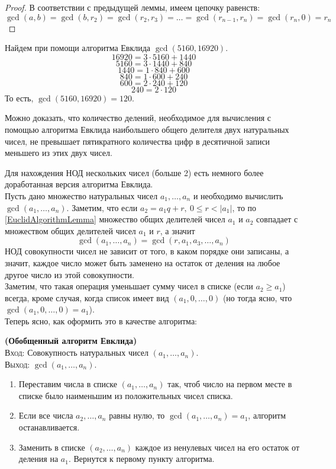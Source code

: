 \documentclass[11pt]{article}
\begin{document}
	\begin{proof}
	    В соответствии с предыдущей леммы, имеем цепочку равенств:
		\[ \gcd(a, b) = \gcd(b, r_2) = \gcd(r_2, r_3) = \ldots = \gcd(r_{n - 1}, r_n) = \gcd(r_n, 0) = r_n \]
	\end{proof}
	\begin{example} Найдем при помощи алгоритма Евклида $\gcd(5160, 16920)$.
	\[ 16920 = 3 \cdot 5160 + 1440 \]
	\[ 5160 = 3 \cdot 1440 + 840 \]
	\[ 1440 = 1 \cdot 840 + 600 \]
	\[ 840 = 1 \cdot 600 + 240 \]
	\[ 600 = 2 \cdot 240 + 120 \]
	\[ 240 = 2 \cdot 120 \]
	То есть, $\gcd(5160, 16920) = 120$.
	\end{example}
	\begin{remark}
	    Можно доказать, что количество делений, необходимое для вычисления с помощью алгоритма Евклида наибольшего
		общего делителя двух натуральных чисел, не превышает пятикратного количества цифр в десятичной записи меньшего из
		этих двух чисел.
	\end{remark}
	Для нахождения НОД нескольких чисел (больше 2) есть немного более доработанная версия алгоритма Евклида. \\
	Пусть дано множество натуральных чисел $a_1, \ldots, a_n$ и необходимо вычислить $\gcd(a_1, \ldots, a_n)$.
	Заметим, что если $a_2 = a_1 q + r, \ 0 \le r < |a_1|$, то по \ref{EuclidAlgorithmLemma} множество общих делителей
	чисел $a_1$ и $a_2$ совпадает с множеством общих делителей чисел $a_1$ и $r$, а значит
	\[ \gcd(a_1, \ldots, a_n) = \gcd(r, a_1, a_3, \ldots, a_n)\]
	НОД совокупности чисел не зависит от того, в каком порядке они записаны, а значит, каждое число может быть заменено на
	остаток от деления на любое другое число из этой совокупности. \\
	Заметим, что такая операция уменьшает сумму чисел в списке (если $a_2 \ge a_1$) всегда, кроме случая, когда
	список имеет вид $(a_1, 0, \ldots, 0)$ (но тогда ясно, что $\gcd(a_1, 0, \ldots, 0) = a_1$).\\
	Теперь ясно, как оформить это в качестве алгоритма:
	\begin{theorem} \textbf{(Обобщенный алгоритм Евклида)}\\
	\textsc{Вход:} Совокупность натуральных чисел  $(a_1, \ldots, a_n)$.\\
	\textsc{Выход:} $\gcd(a_1, \ldots, a_n)$.
		\begin{enumerate}

			\item Переставим числа в списке $(a_1, \ldots, a_n)$ так, чтоб число на первом месте в списке было наименьшим из
				  положительных чисел списка.

			\item Если все числа $a_2, \ldots, a_n$ равны нулю, то $\gcd(a_1, \ldots, a_n) = a_1$, алгоритм останавливается.

			\item Заменить в списке $(a_2, \ldots, a_n)$ каждое из ненулевых чисел на его остаток от деления на $a_1$. Вернутся к первому
				  пункту алгоритма.

		\end{enumerate}
	\end{theorem}
\end{document}
